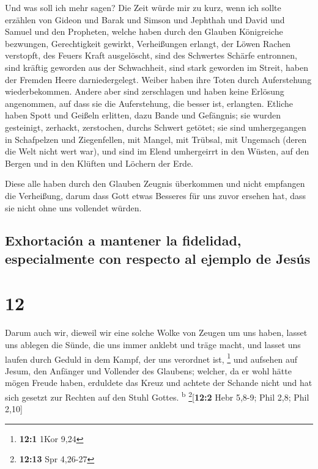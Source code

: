  Und was soll ich mehr sagen? Die Zeit würde mir zu kurz,
wenn ich sollte erzählen von Gideon und Barak und Simson und Jephthah
und David und Samuel und den Propheten,  welche haben
durch den Glauben Königreiche bezwungen, Gerechtigkeit gewirkt,
Verheißungen erlangt, der Löwen Rachen verstopft,  des
Feuers Kraft ausgelöscht, sind des Schwertes Schärfe entronnen, sind
kräftig geworden aus der Schwachheit, sind stark geworden im Streit,
haben der Fremden Heere darniedergelegt.  Weiber haben
ihre Toten durch Auferstehung wiederbekommen. Andere aber sind
zerschlagen und haben keine Erlösung angenommen, auf dass sie die
Auferstehung, die besser ist, erlangten.  Etliche haben
Spott und Geißeln erlitten, dazu Bande und Gefängnis; 
sie wurden gesteinigt, zerhackt, zerstochen, durchs Schwert getötet; sie
sind umhergegangen in Schafpelzen und Ziegenfellen, mit Mangel, mit
Trübsal, mit Ungemach  (deren die Welt nicht wert war),
und sind im Elend umhergeirrt in den Wüsten, auf den Bergen und in den
Klüften und Löchern der Erde.

 Diese alle haben durch den Glauben Zeugnis überkommen
und nicht empfangen die Verheißung,  darum dass Gott
etwas Besseres für uns zuvor ersehen hat, dass sie nicht ohne uns
vollendet würden.

\hypertarget{exhortaciuxf3n-a-mantener-la-fidelidad-especialmente-con-respecto-al-ejemplo-de-jesuxfas}{%
\subsection{Exhortación a mantener la fidelidad, especialmente con
respecto al ejemplo de
Jesús}\label{exhortaciuxf3n-a-mantener-la-fidelidad-especialmente-con-respecto-al-ejemplo-de-jesuxfas}}

\hypertarget{section-11}{%
\section{12}\label{section-11}}

 Darum auch wir, dieweil wir eine solche Wolke von Zeugen
um uns haben, lasset uns ablegen die Sünde, die uns immer anklebt und
träge macht, und lasset uns laufen durch Geduld in dem Kampf, der uns
verordnet ist, \footnote{\textbf{12:1} 1Kor 9,24}  und
aufsehen auf Jesum, den Anfänger und Vollender des Glaubens; welcher, da
er wohl hätte mögen Freude haben, erduldete das Kreuz und achtete der
Schande nicht und hat sich gesetzt zur Rechten auf den Stuhl Gottes.
\textsuperscript{b} \footnote{\textbf{12:13} Spr 4,26-27}{[}\textbf{12:2}
Hebr 5,8-9; Phil 2,8; Phil 2,10{]}

